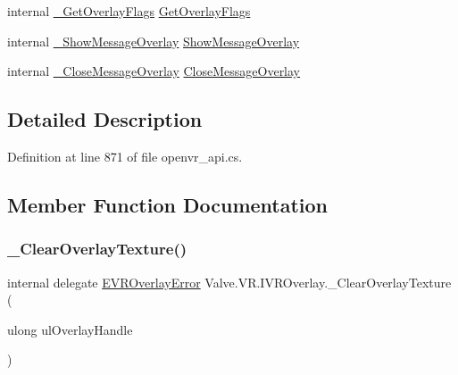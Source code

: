 \begin{DoxyCompactItemize}
\item 
internal \mbox{\hyperlink{struct_valve_1_1_v_r_1_1_i_v_r_overlay_a0706f71c80fe30f2327615ff966bdd66}{\+\_\+\+Get\+Overlay\+Flags}} \mbox{\hyperlink{struct_valve_1_1_v_r_1_1_i_v_r_overlay_a4c8c715b6a590f8d3c3a7e3ccd1161a6}{Get\+Overlay\+Flags}}
\item 
internal \mbox{\hyperlink{struct_valve_1_1_v_r_1_1_i_v_r_overlay_afadb2a0056062a8d7e051a7d961f782e}{\+\_\+\+Show\+Message\+Overlay}} \mbox{\hyperlink{struct_valve_1_1_v_r_1_1_i_v_r_overlay_ad1ba80d569cd8ec1a5687e275909b1f4}{Show\+Message\+Overlay}}
\item 
internal \mbox{\hyperlink{struct_valve_1_1_v_r_1_1_i_v_r_overlay_a66281ebc63f5c30dc48e38ec5c4c8c5e}{\+\_\+\+Close\+Message\+Overlay}} \mbox{\hyperlink{struct_valve_1_1_v_r_1_1_i_v_r_overlay_a775930fee28a56a0c8a04e4dbf0d52e2}{Close\+Message\+Overlay}}
\end{DoxyCompactItemize}


\subsection{Detailed Description}


Definition at line 871 of file openvr\+\_\+api.\+cs.



\subsection{Member Function Documentation}
\mbox{\label{struct_valve_1_1_v_r_1_1_i_v_r_overlay_a61c25dec5b16f1e2d942f792c7adc53b}} 
\subsubsection{\texorpdfstring{\_ClearOverlayTexture()}{\_ClearOverlayTexture()}}
{\footnotesize\ttfamily internal delegate \mbox{\hyperlink{namespace_valve_1_1_v_r_aaee5c5144f42b7969d45b854f51b0c18}{E\+V\+R\+Overlay\+Error}} Valve.\+V\+R.\+I\+V\+R\+Overlay.\+\_\+\+Clear\+Overlay\+Texture (\begin{DoxyParamCaption}\item[{ulong}]{ul\+Overlay\+Handle }\end{DoxyParamCaption})}

